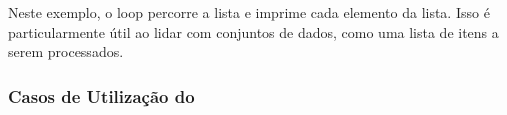 \documentclass[letterpaper,10pt,english]{jupyterBook}
\begin{document}
\sphinxAtStartPar
{}

\begin{sphinxVerbatim}[commandchars=\\\{\}]
  \PYG{p}{[}  \PYG{p}{]}
   
\end{sphinxVerbatim}

\sphinxAtStartPar
{}

\begin{sphinxVerbatim}[commandchars=\\\{\}]
\end{sphinxVerbatim}

\sphinxAtStartPar
Neste exemplo, o loop  percorre a lista  e imprime cada elemento da lista. Isso é particularmente útil ao lidar com conjuntos de dados, como uma lista de itens a serem processados.


\subsubsection{Casos de Utilização do }
\label{\detokenize{chapters/ch4/ch4:casos-de-utilizacao-do-for}}
\sphinxAtStartPar
{}

\begin{sphinxVerbatim}[commandchars=\\\{\}]
    
\end{sphinxVerbatim}

\sphinxAtStartPar
{}

\begin{sphinxVerbatim}[commandchars=\\\{\}]
\end{sphinxVerbatim}
\end{document}
